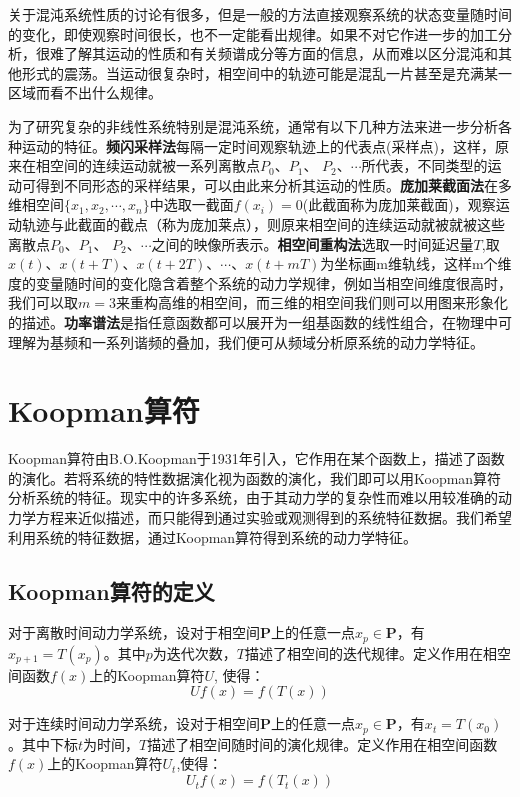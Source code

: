 关于混沌系统性质的讨论有很多，但是一般的方法直接观察系统的状态变量随时间的变化，即使观察时间很长，也不一定能看出规律。如果不对它作进一步的加工分析，很难了解其运动的性质和有关频谱成分等方面的信息，从而难以区分混沌和其他形式的震荡。当运动很复杂时，相空间中的轨迹可能是混乱一片甚至是充满某一区域而看不出什么规律。

为了研究复杂的非线性系统特别是混沌系统，通常有以下几种方法来进一步分析各种运动的特征。\textbf{频闪采样法}每隔一定时间观察轨迹上的代表点(采样点)，这样，原来在相空间的连续运动就被一系列离散点$P_0$、$P_1$、
$P_2$、$\cdots$所代表，不同类型的运动可得到不同形态的采样结果，可以由此来分析其运动的性质。\textbf{庞加莱截面法}在多维相空间$\{x_1,x_2,\cdots,x_n\}$中选取一截面$f(x_i)=0$(此截面称为庞加莱截面)，观察运动轨迹与此截面的截点（称为庞加莱点），则原来相空间的连续运动就被就被这些离散点$P_0$、$P_1$、
$P_2$、$\cdots$之间的映像所表示。\textbf{相空间重构法}选取一时间延迟量$T$,取$x(t)$、$x(t+T)$、$x(t+2T)$、$\cdots$、$x(t+mT)$为坐标画m维轨线，这样m个维度的变量随时间的变化隐含着整个系统的动力学规律，例如当相空间维度很高时，我们可以取$m=3$来重构高维的相空间，而三维的相空间我们则可以用图来形象化的描述。\textbf{功率谱法}是指任意函数都可以展开为一组基函数的线性组合，在物理中可理解为基频和一系列谐频的叠加，我们便可从频域分析原系统的动力学特征。



\section{Koopman算符}
Koopman算符由B.O.Koopman于1931年引入，它作用在某个函数上，描述了函数的演化。若将系统的特性数据演化视为函数的演化，我们即可以用Koopman算符分析系统的特征。现实中的许多系统，由于其动力学的复杂性而难以用较准确的动力学方程来近似描述，而只能得到通过实验或观测得到的系统特征数据。我们希望利用系统的特征数据，通过Koopman算符得到系统的动力学特征。

\subsection{Koopman算符的定义}
对于离散时间动力学系统，设对于相空间$\mathbf{P}$上的任意一点$x_p\in \mathbf{P}$，有$x_{p+1}=T(x_p)$。其中$p$为迭代次数，$T$描述了相空间的迭代规律。定义作用在相空间函数$f(x)$上的Koopman算符$U$, 使得：
\begin{equation}
    Uf(x)=f(T(x))
\end{equation}

对于连续时间动力学系统，设对于相空间$\mathbf{P}$上的任意一点$x_p\in \mathbf{P}$，有$x_t=T(x_0)$。其中下标$t$为时间，$T$描述了相空间随时间的演化规律。定义作用在相空间函数$f(x)$上的Koopman算符$U_t$,使得：
\begin{equation}
    U_tf(x)=f(T_t(x))
\end{equation} 

